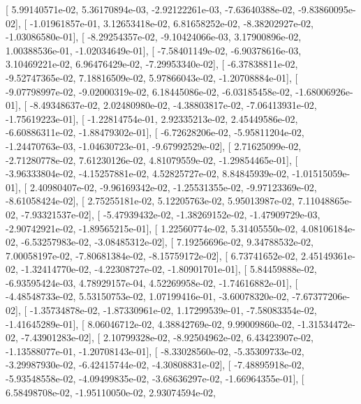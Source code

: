 \documentclass{article}
\begin{document}
       [  5.99140571e-02,   5.36170894e-03,  -2.92122261e-03,
         -7.63640388e-02,  -9.83860095e-02],
       [ -1.01961857e-01,   3.12653418e-02,   6.81658252e-02,
         -8.38202927e-02,  -1.03086580e-01],
       [ -8.29254357e-02,  -9.10424066e-03,   3.17900896e-02,
          1.00388536e-01,  -1.02034649e-01],
       [ -7.58401149e-02,  -6.90378616e-03,   3.10469221e-02,
          6.96476429e-02,  -7.29953340e-02],
       [ -6.37838811e-02,  -9.52747365e-02,   7.18816509e-02,
          5.97866043e-02,  -1.20708884e-01],
       [ -9.07798997e-02,  -9.02000319e-02,   6.18445086e-02,
         -6.03185458e-02,  -1.68006926e-01],
       [ -8.49348637e-02,   2.02480980e-02,  -4.38803817e-02,
         -7.06413931e-02,  -1.75619223e-01],
       [ -1.22814754e-01,   2.92335213e-02,   2.45449586e-02,
         -6.60886311e-02,  -1.88479302e-01],
       [ -6.72628206e-02,  -5.95811204e-02,  -1.24470763e-03,
         -1.04630723e-01,  -9.67992529e-02],
       [  2.71625099e-02,  -2.71280778e-02,   7.61230126e-02,
          4.81079559e-02,  -1.29854465e-01],
       [ -3.96333804e-02,  -4.15257881e-02,   4.52825727e-02,
          8.84845939e-02,  -1.01515059e-01],
       [  2.40980407e-02,  -9.96169342e-02,  -1.25531355e-02,
         -9.97123369e-02,  -8.61058424e-02],
       [  2.75255181e-02,   5.12205763e-02,   5.95013987e-02,
          7.11048865e-02,  -7.93321537e-02],
       [ -5.47939432e-02,  -1.38269152e-02,  -1.47909729e-03,
         -2.90742921e-02,  -1.89565215e-01],
       [  1.22560774e-02,   5.31405550e-02,   4.08106184e-02,
         -6.53257983e-02,  -3.08485312e-02],
       [  7.19256696e-02,   9.34788532e-02,   7.00058197e-02,
         -7.80681384e-02,  -8.15759172e-02],
       [  6.73741652e-02,   2.45149361e-02,  -1.32414770e-02,
         -4.22308727e-02,  -1.80901701e-01],
       [  5.84459888e-02,  -6.93595424e-03,   4.78929157e-04,
          4.52269958e-02,  -1.74616882e-01],
       [ -4.48548733e-02,   5.53150753e-02,   1.07199416e-01,
         -3.60078320e-02,  -7.67377206e-02],
       [ -1.35734878e-02,  -1.87330961e-02,   1.17299539e-01,
         -7.58083354e-02,  -1.41645289e-01],
       [  8.06046712e-02,   4.38842769e-02,   9.99009860e-02,
         -1.31534472e-02,  -7.43901283e-02],
       [  2.10799328e-02,  -8.92504962e-02,   6.43423907e-02,
         -1.13588077e-01,  -1.20708143e-01],
       [ -8.33028560e-02,  -5.35309733e-02,  -3.29987930e-02,
         -6.42415744e-02,  -4.30808831e-02],
       [ -7.48895918e-02,  -5.93548558e-02,  -4.09499835e-02,
         -3.68636297e-02,  -1.66964355e-01],
       [  6.58498708e-02,  -1.95110050e-02,   2.93074594e-02,
\end{document}
